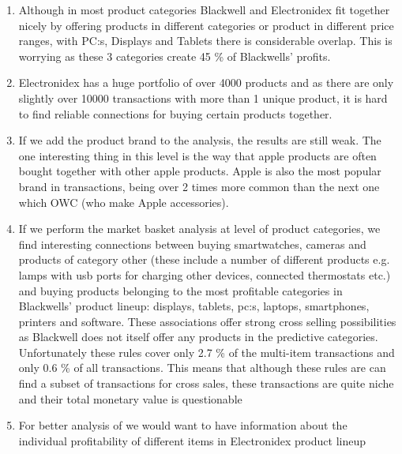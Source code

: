 \documentclass[12pt,a4paper,leqno]{report}
\theoremstyle{plain}
\theoremstyle{definition}
\theoremstyle{remark}
\begin{document}
\begin{enumerate}
    
    \item Although in most product categories Blackwell and Electronidex fit together nicely by offering products in different categories or
    product in different price ranges, with PC:s, Displays and Tablets there is considerable overlap. This is worrying as these 3
    categories create 45 \% of Blackwells' profits.

    \item Electronidex has a huge portfolio of over 4000 products and as there are only slightly over 10000
    transactions with more than 1 unique product, it is hard to find reliable connections for
    buying certain products together.

    \item If we add the product brand to the analysis, the results are still weak. The one interesting
    thing in this level is the way that apple products are often bought together with other
    apple products. Apple is also the most popular brand in transactions, being over 2 times
    more common than the next one which OWC (who make Apple accessories).

    \item If we perform the market basket analysis at level of product categories, we find interesting
    connections between buying smartwatches, cameras and products of category other (these include
    a number of different products e.g. lamps with usb ports for charging other devices, connected
    thermostats etc.) and buying products belonging to the most profitable categories
    in Blackwells' product lineup: displays, tablets, pc:s, laptops, smartphones, printers and software.
    These associations offer strong cross selling possibilities as Blackwell does not itself
    offer any products in the predictive categories. Unfortunately these rules cover only
    2.7 \% of the multi-item transactions and only 0.6 \% of all transactions. This means that
    although these rules are can find a subset of transactions for cross sales, these transactions
    are quite niche and their total monetary value is questionable
    
    \item For better analysis of we would want to have information about the individual profitability
    of different items in Electronidex product lineup
 
\end{enumerate}
\end{document}
